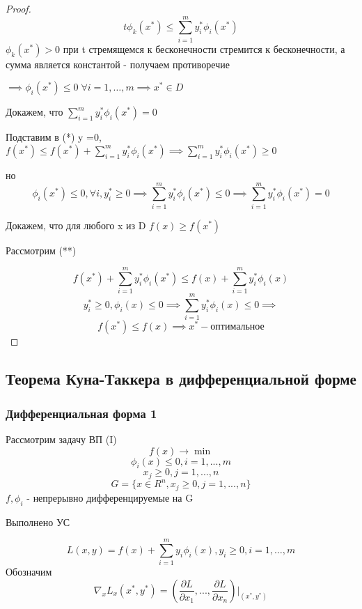 \documentclass[a4paper]{article}
\theoremstyle{definition}
\theoremstyle{remark}
\begin{document}
\begin{proof}
    \[t\phi_k(x^*) \le \sum_{i = 1}^m y_i^* \phi_i(x^*)\]
    $\phi_k(x^*)>0$ при t стремящемся к бесконечности стремится к бесконечности, а сумма является константой - получаем противоречие

    $\implies \phi_i(x^*)\le 0 \; \forall i = 1, \dots, m\implies x^* \in D$

    Докажем, что $\sum_{i = 1}^m y_i^* \phi_i(x^*) = 0$
    
    Подставим в (*) y =0, $f(x^*)\le f(x^*) + \sum_{i = 1}^m y_i^* \phi_i(x^*) \implies \sum_{i = 1}^m y_i^* \phi_i(x^*) \ge 0$
    
    но \[\phi_i(x^*)\le 0 , \forall i, y^*_i\ge0 \implies \sum_{i = 1}^m y_i^* \phi_i(x^*) \le 0 \implies \sum_{i = 1}^m y_i^* \phi_i(x^*) = 0\]
    
    Докажем, что для любого x из D $f(x)\ge f(x^*)$

    Рассмотрим (**)

    \[f(x^*) + \sum_{i = 1}^m y_i^* \phi_i(x^*) \le f(x) + \sum_{i = 1}^m y_i^* \phi_i(x)\]
    \[y^*_i \ge0, \phi_i(x)\le 0\implies \sum_{i = 1}^m y_i^* \phi_i(x)\le 0 \implies\]
    \[f(x^*)\le f(x)\implies x^* - \textbf{оптимальное}\]
\end{proof}
\subsection{Теорема Куна-Таккера в дифференциальной форме}
\subsubsection{Дифференциальная форма 1}
Рассмотрим задачу ВП  (I)
\[f(x)\to \min\]
\[\phi_i(x)\le 0, i = 1, ..., m\]
\[x_j \ge 0, j = 1, ..., n\]
\[G = \{x\in R^n, x_j \ge 0, j = 1, ..., n\}\]
$f, \phi_i$ - непрерывно дифференцируемые на G

Выполнено УС

\[L(x, y) = f(x) +\sum_{i = 1}^{m}y_i \phi_i(x), y_i\ge 0 , i = 1, \dots, m\]
Обозначим \[\nabla_x L_x(x^*, y^*) = (\frac{\partial L}{\partial x_1}, ..., \frac{\partial L}{\partial x_n})|_{(x^*, y^*)}\]
\end{document}
